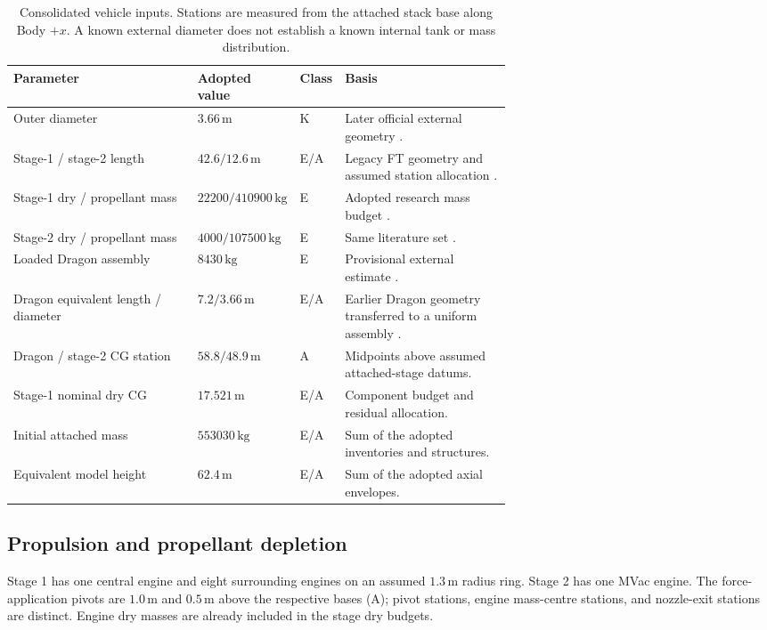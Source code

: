 \begin{table}[!htbp]
\centering\small
\begin{tabularx}{\linewidth}{@{}p{0.37\linewidth}p{0.20\linewidth}p{0.08\linewidth}X@{}}
\toprule
Parameter & Adopted value & Class & Basis \\
\midrule
Outer diameter & $3.66\,\mathrm{m}$ & K & Later official external geometry \cite{spacexguide2025}. \\
Stage-1 / stage-2 length & $42.6/12.6\,\mathrm{m}$ & E/A & Legacy FT geometry and assumed station allocation \cite{faa2018}. \\
Stage-1 dry / propellant mass & $22200/410900\,\mathrm{kg}$ & E & Adopted research mass budget \cite{pezent2024}. \\
Stage-2 dry / propellant mass & $4000/107500\,\mathrm{kg}$ & E & Same literature set \cite{pezent2024}. \\
Loaded Dragon assembly & $8430\,\mathrm{kg}$ & E & Provisional external estimate \cite{kyledatasheet}. \\
Dragon equivalent length / diameter & $7.2/3.66\,\mathrm{m}$ & E/A & Earlier Dragon geometry transferred to a uniform assembly \cite{crs1presskit}. \\
Dragon / stage-2 CG station & $58.8/48.9\,\mathrm{m}$ & A & Midpoints above assumed attached-stage datums. \\
Stage-1 nominal dry CG & $17.521\,\mathrm{m}$ & E/A & Component budget and residual allocation. \\
Initial attached mass & $553030\,\mathrm{kg}$ & E/A & Sum of the adopted inventories and structures. \\
Equivalent model height & $62.4\,\mathrm{m}$ & E/A & Sum of the adopted axial envelopes. \\
\bottomrule
\end{tabularx}
\caption{Consolidated vehicle inputs. Stations are measured from the attached stack base along Body $+x$. A known external diameter does not establish a known internal tank or mass distribution.}
\label{tab:vehicle}
\end{table}

\subsection{Propulsion and propellant depletion}
Stage 1 has one central engine and eight surrounding engines on an assumed $1.3\,\mathrm{m}$ radius ring. Stage 2 has one MVac engine. The force-application pivots are $1.0\,\mathrm{m}$ and $0.5\,\mathrm{m}$ above the respective bases (A); pivot stations, engine mass-centre stations, and nozzle-exit stations are distinct. Engine dry masses are already included in the stage dry budgets.

